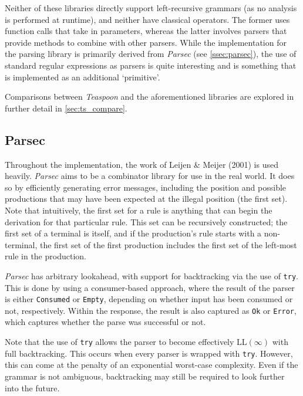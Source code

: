 Neither of these libraries directly support left-recursive grammars (as no analysis is performed at runtime), and neither have classical operators.
The former uses function calls that take in parameters, whereas the latter involves parsers that provide methods to combine with other parsers.
While the implementation for the parsing library is primarily derived from \textit{Parsec} (see \autoref{ssec:parsec}), the use of standard regular expressions as parsers is quite interesting and is something that is implemented as an additional `primitive'.

Comparisons between \textit{Teaspoon} and the aforementioned libraries are explored in further detail in \autoref{sec:ts_compare}.

\subsection{Parsec}
\label{ssec:parsec}

Throughout the implementation, the work of Leijen \& Meijer (2001) \cite{leijen01} is used heavily.
\textit{Parsec} aims to be a combinator library for use in the real world.
It does so by efficiently generating error messages, including the position and possible productions that may have been expected at the illegal position (the first set).
Note that intuitively, the first set for a rule is anything that can begin the derivation for that particular rule.
This set can be recursively constructed; the first set of a terminal is itself, and if the production's rule starts with a non-terminal, the first set of the first production includes the first set of the left-most rule in the production.

\textit{Parsec} has arbitrary lookahead, with support for backtracking via the use of \texttt{try}.
This is done by using a consumer-based approach, where the result of the parser is either \texttt{Consumed} or \texttt{Empty}, depending on whether input has been consumed or not, respectively.
Within the response, the result is also captured as \texttt{Ok} or \texttt{Error}, which captures whether the parse was successful or not.

Note that the use of \texttt{try} allows the parser to become effectively $\text{LL}(\infty)$ with full backtracking.
This occurs when every parser is wrapped with \texttt{try}.
However, this can come at the penalty of an exponential worst-case complexity.
Even if the grammar is not ambiguous, backtracking may still be required to look further into the future.

